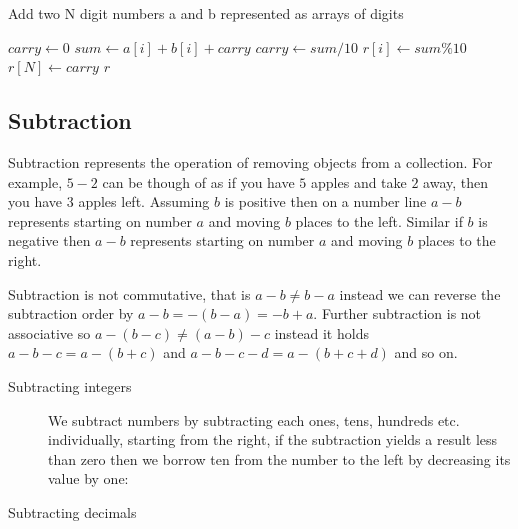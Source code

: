 \begin{algorithm}[H]
    \caption{Add two N digit numbers a and b represented as arrays of digits}
    \label{arit:addition}
    \begin{algorithmic}[1]
            \State $carry \gets 0$ 
                \State $sum \gets a[i] + b[i] + carry$
                \State $carry \gets sum / 10$ 
                \State $r[i] \gets sum \% 10$ 
            \EndFor
            \State $r[N] \gets carry$
            \Return $r$  
        \EndProcedure
    \end{algorithmic}
\end{algorithm}

\subsection{Subtraction}
Subtraction represents the operation of removing objects from a collection. For example, $5-2$ can be though of as if you have $5$ apples and take $2$ away, then you have $3$ apples left. Assuming $b$ is positive then on a number line $a-b$ represents starting on number $a$ and moving $b$ places to the left. Similar if $b$ is negative then $a-b$ represents starting on number $a$ and moving $b$ places to the right.

Subtraction is not commutative, that is $a - b \neq b - a$ instead we can reverse the subtraction order by $a - b = -(b - a) = -b + a$. Further subtraction is not associative so $a  - (b - c) \neq (a - b) - c$ instead it holds $a - b - c = a - (b + c)$ and $a - b - c - d = a - (b + c + d)$ and so on.
\begin{description}
\item [Subtracting integers] We subtract numbers by subtracting each
ones, tens, hundreds etc. individually, starting from the right, if the
subtraction yields a result less than zero then we borrow ten from the
number to the left by decreasing its value by one:
\begin{figure}[H]
\centering
{}
\end{figure}
\item [Subtracting decimals]
\end{description}

